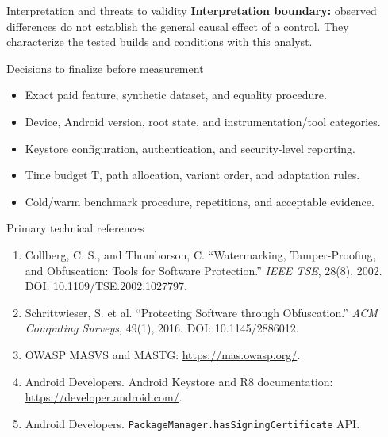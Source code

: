 \documentclass[final]{beamer}
\newlength{\sepwidth}
\newlength{\colwidth}
\newcommand{\separatorcolumn}{\begin{column}{\sepwidth}\end{column}}
\begin{document}
\begin{frame}[t]
\begin{columns}[t]
\begin{column}{\colwidth}
\begin{block}{Interpretation and threats to validity}
  \textbf{Interpretation boundary:} observed differences do not establish the
  general causal effect of a control. They characterize the tested builds and
  conditions with this analyst.
\end{block}

\begin{exampleblock}{Decisions to finalize before measurement}
  \begin{itemize}
    \item Exact paid feature, synthetic dataset, and equality procedure.
    \item Device, Android version, root state, and instrumentation/tool categories.
    \item Keystore configuration, authentication, and security-level reporting.
    \item Time budget T, path allocation, variant order, and adaptation rules.
    \item Cold/warm benchmark procedure, repetitions, and acceptable evidence.
  \end{itemize}
\end{exampleblock}

\begin{block}{Primary technical references}
  \small
  \begin{enumerate}
    \item Collberg, C. S., and Thomborson, C. ``Watermarking,
      Tamper-Proofing, and Obfuscation: Tools for Software Protection.''
      \emph{IEEE TSE}, 28(8), 2002. DOI: 10.1109/TSE.2002.1027797.
    \item Schrittwieser, S. et al. ``Protecting Software through Obfuscation.''
      \emph{ACM Computing Surveys}, 49(1), 2016. DOI: 10.1145/2886012.
    \item OWASP MASVS and MASTG: \url{https://mas.owasp.org/}.
    \item Android Developers. Android Keystore and R8 documentation:
      \url{https://developer.android.com/}.
    \item Android Developers. \texttt{PackageManager.hasSigningCertificate} API.
  \end{enumerate}
\end{block}

\end{column}
\separatorcolumn
\end{columns}
\end{frame}
\end{document}

